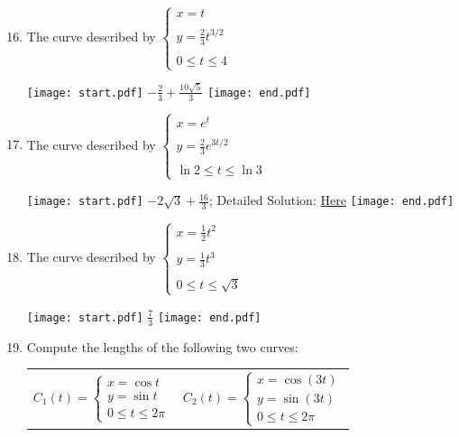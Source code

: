 \documentclass[12pt]{article}
\begin{document}
\begin{enumerate}
\setcounter{enumi}{15}

\item The curve described by $\left\{\begin{array}{l}
x=t\\
\\
y=\frac{2}{3}t^{3/2}\\
\\
0 \leq t \leq 4 \end{array}\right.$

\texttt{[image: start.pdf]}
{{$-\frac{2}{3}+\frac{10\sqrt{5}}{3}$}}
\texttt{[image: end.pdf]}


\item The curve described by $\left\{\begin{array}{l}
x=e^t\\
\\
y=\frac{2}{3}e^{3t/2}\\
\\
\ln{2} \leq t \leq \ln{3} \end{array}\right.$

\texttt{[image: start.pdf]}
{{$-2\sqrt{3}+\frac{16}{3}$; Detailed Solution: \textcolor{blue}{\href{http://www.math.drexel.edu/classes/Calculus/resources/Math122HW/Solutions/122_17_Parametric_17.pdf}{Here}}}}
\texttt{[image: end.pdf]}


\item The curve described by $\left\{\begin{array}{l}
x=\frac{1}{2}t^2\\
\\
y=\frac{1}{3}t^3\\
\\
0 \leq t \leq \sqrt{3} \end{array} \right.$

\texttt{[image: start.pdf]}
{{$\frac{7}{3}$}}
\texttt{[image: end.pdf]}


\item Compute the lengths of the following two curves:

\begin{center}
\begin{tabular}{cc}
$C_1(t)=\left\{\begin{array}{l}
x=\cos{t}\\
y=\sin{t}\\
0 \leq t \leq 2\pi \end{array} \right.$ \hspace{0.5 cm}& \hspace{0.5 cm}
$C_2(t)=\left\{\begin{array}{l}
x=\cos{(3t)}\\
y=\sin{(3t)}\\
0 \leq t \leq 2\pi \end{array} \right.$
\end{tabular}
\end{center}


\end{enumerate}
\end{document}
